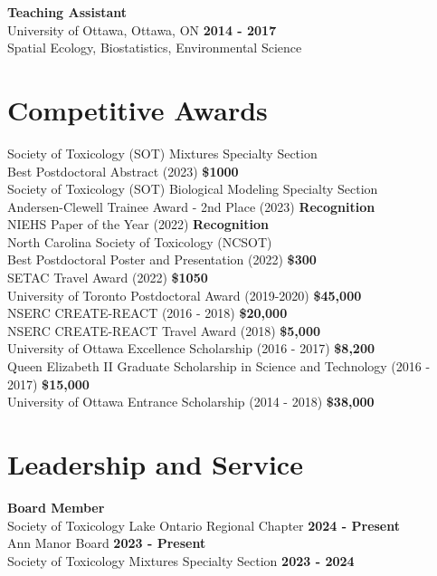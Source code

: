 \documentclass[margin,line]{res}
\newcommand\tab[1][1cm]{\hspace*{#1}}
\begin{document}
\begin{resume}
\textbf{Teaching Assistant }\\
University of Ottawa, Ottawa, ON
\hfill {\textbf{2014 - 2017}}\\
Spatial Ecology, Biostatistics, Environmental Science

\vspace*{.1in}

\section{\sc Competitive Awards}

Society of Toxicology (SOT) Mixtures Specialty Section\\
\tab Best Postdoctoral Abstract (2023)
\hfill {\textbf{\$1000}}\\
Society of Toxicology (SOT) Biological Modeling Specialty Section\\
\tab Andersen-Clewell Trainee Award - 2nd Place (2023)
\hfill {\textbf{Recognition}}\\
NIEHS Paper of the Year (2022)
\hfill {\textbf{Recognition}}\\
North Carolina Society of Toxicology (NCSOT)\\
\tab Best Postdoctoral Poster and Presentation (2022)
\hfill {\textbf{\$300}}\\
SETAC Travel Award (2022)
\hfill {\textbf{\$1050}}\\
University of Toronto Postdoctoral Award (2019-2020)
\hfill {\textbf{\$45,000}}\\
NSERC CREATE-REACT (2016 - 2018)
\hfill {\textbf{\$20,000}}\\
NSERC CREATE-REACT Travel Award (2018)
\hfill {\textbf{\$5,000}}\\
University of Ottawa Excellence Scholarship (2016 - 2017)
\hfill {\textbf{\$8,200}}\\
Queen Elizabeth II Graduate Scholarship in Science and Technology (2016 - 2017)
\hfill {\textbf{\$15,000}}\\
University of Ottawa Entrance Scholarship (2014 - 2018)
\hfill {\textbf{\$38,000}}\\

\vspace*{.1in}

\section{\sc Leadership and Service}
{\bf Board Member}\\
{Society of Toxicology Lake Ontario Regional Chapter} \hfill {\bf 2024 - Present}\\
{Ann Manor Board} \hfill {\bf 2023 - Present}\\
{Society of Toxicology Mixtures Specialty Section} \hfill {\bf 2023 - 2024}\\


\end{resume}
\end{document}
